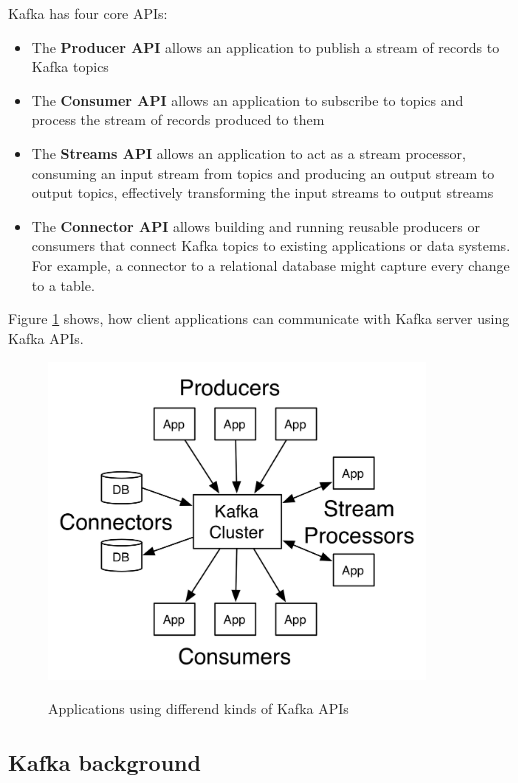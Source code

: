Kafka has four core APIs:
\begin{itemize}
  \item The \textbf{Producer API} allows an application to publish
    a stream of records to Kafka topics
  \item The \textbf{Consumer API} allows an application to subscribe
    to topics and process the stream of records produced to them
  \item The \textbf{Streams API} allows an application to act as a stream processor,
    consuming an input stream from topics and producing an output stream to output topics,
    effectively transforming the input streams to output streams
  \item The \textbf{Connector API} allows building and running reusable producers or consumers
    that connect Kafka topics to existing applications or data systems.
    For example, a connector to a relational database might capture every change to a table. 
\end{itemize}

Figure \ref{frameworks:kafka:api} shows, how client applications can communicate with Kafka server
using Kafka APIs.

\begin{figure}[h]
  \center
  \includegraphics[width=100mm]{img/kafka-apis.png}
  \label{frameworks:kafka:api}
  \caption{Applications using differend kinds of Kafka APIs}
\end{figure}



\subsection{Kafka background \label{frameworks:kafka:background}}

